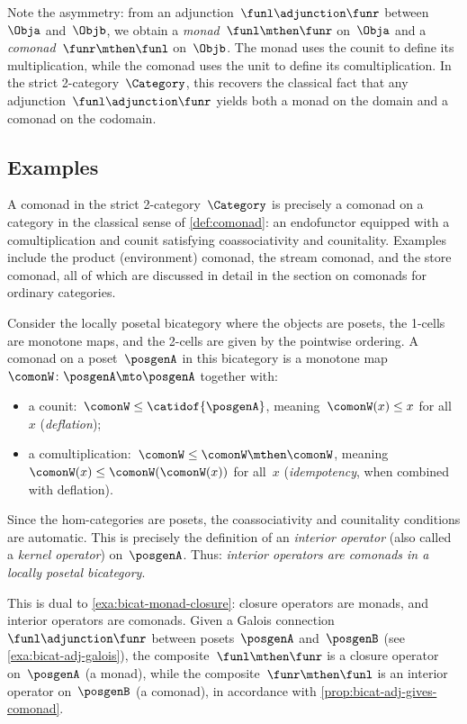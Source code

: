 \begin{remark}
    Note the asymmetry: from an adjunction~$\funl \adjunction \funr$ between~$\Obja$ and~$\Objb$, we obtain a \emph{monad}~$\funl \mthen \funr$ on~$\Obja$ and a \emph{comonad}~$\funr \mthen \funl$ on~$\Objb$.
    The monad uses the counit to define its multiplication, while the comonad uses the unit to define its comultiplication.
    In the strict 2-category~$\Category$, this recovers the classical fact that any adjunction~$\funl \adjunction \funr$ yields both a monad on the domain and a comonad on the codomain.
\end{remark}

\subsection{Examples}

\begin{example}
    \label{exa:bicat-comonad-cat}
    A comonad in the strict 2-category~$\Category$ is precisely a comonad on a category in the classical sense of \cref{def:comonad}: an endofunctor equipped with a comultiplication and counit satisfying coassociativity and counitality.
    Examples include the product (environment) comonad, the stream comonad, and the store comonad, all of which are discussed in detail in the section on comonads for ordinary categories.
\end{example}

\begin{example}
    \label{exa:bicat-comonad-interior}
    Consider the locally posetal bicategory where the objects are posets, the 1-cells are monotone maps, and the 2-cells are given by the pointwise ordering.
    A comonad on a poset~$\posgenA$ in this bicategory is a monotone map~$\comonW \colon \posgenA \mto \posgenA$ together with:
    \begin{itemize}
        \item a counit:~$\comonW \leq \catidof{\posgenA}$, meaning~$\comonW(x) \leq x$ for all~$x$ (\emph{deflation});
        \item a comultiplication:~$\comonW \leq \comonW \mthen \comonW$, meaning~$\comonW(x) \leq \comonW(\comonW(x))$ for all~$x$ (\emph{idempotency}, when combined with deflation).
    \end{itemize}
    Since the hom-categories are posets, the coassociativity and counitality conditions are automatic.
    This is precisely the definition of an \emph{interior operator} (also called a \emph{kernel operator}) on~$\posgenA$.
    Thus: \emph{interior operators are comonads in a locally posetal bicategory}.

    This is dual to \cref{exa:bicat-monad-closure}: closure operators are monads, and interior operators are comonads.
    Given a Galois connection~$\funl \adjunction \funr$ between posets~$\posgenA$ and~$\posgenB$ (see \cref{exa:bicat-adj-galois}), the composite~$\funl \mthen \funr$ is a closure operator on~$\posgenA$ (a monad), while the composite~$\funr \mthen \funl$ is an interior operator on~$\posgenB$ (a comonad), in accordance with \cref{prop:bicat-adj-gives-comonad}.
\end{example}

